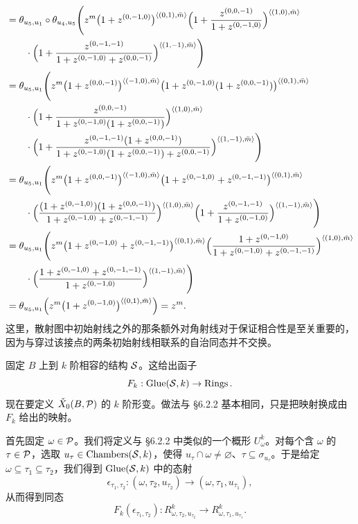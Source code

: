 \begin{example}
\[
  \begin{aligned}
  &=\theta_{u_5,u_1}\circ\theta_{u_4,u_5}
  \Biggl(z^m\bigl(1+z^{(0,-1,0)}\bigr)^{\langle(0,1),\bar m\rangle}
  \Bigl(1+\frac{z^{(0,0,-1)}}{1+z^{(0,-1,0)}}\Bigr)^{\langle(1,0),\bar m\rangle}\\
  &\qquad\cdot\Bigl(1+\frac{z^{(0,-1,-1)}}{1+z^{(0,-1,0)}+z^{(0,0,-1)}}\Bigr)^{\langle(1,-1),\bar m\rangle}\Biggr)\\
  &=\theta_{u_5,u_1}
  \Biggl(z^m\bigl(1+z^{(0,0,-1)}\bigr)^{\langle(-1,0),\bar m\rangle}
  \bigl(1+z^{(0,-1,0)}(1+z^{(0,0,-1)})\bigr)^{\langle(0,1),\bar m\rangle}\\
  &\qquad\cdot\Bigl(1+\frac{z^{(0,0,-1)}}{1+z^{(0,-1,0)}(1+z^{(0,0,-1)})}\Bigr)^{\langle(1,0),\bar m\rangle}\\
  &\qquad\cdot\Bigl(1+\frac{z^{(0,-1,-1)}(1+z^{(0,0,-1)})}
  {1+z^{(0,-1,0)}(1+z^{(0,0,-1)})+z^{(0,0,-1)}}\Bigr)^{\langle(1,-1),\bar m\rangle}\Biggr)\\
  &=\theta_{u_5,u_1}
  \Biggl(z^m\bigl(1+z^{(0,0,-1)}\bigr)^{\langle(-1,0),\bar m\rangle}
  \bigl(1+z^{(0,-1,0)}+z^{(0,-1,-1)}\bigr)^{\langle(0,1),\bar m\rangle}\\
  &\qquad\cdot\Bigl(\frac{(1+z^{(0,-1,0)})(1+z^{(0,0,-1)})}
  {1+z^{(0,-1,0)}+z^{(0,-1,-1)}}\Bigr)^{\langle(1,0),\bar m\rangle}
  \Bigl(1+\frac{z^{(0,-1,-1)}}{1+z^{(0,-1,0)}}\Bigr)^{\langle(1,-1),\bar m\rangle}\Biggr)\\
  &=\theta_{u_5,u_1}
  \Biggl(z^m\bigl(1+z^{(0,-1,0)}+z^{(0,-1,-1)}\bigr)^{\langle(0,1),\bar m\rangle}
  \Bigl(\frac{1+z^{(0,-1,0)}}{1+z^{(0,-1,0)}+z^{(0,-1,-1)}}\Bigr)^{\langle(1,0),\bar m\rangle}\\
  &\qquad\cdot\Bigl(\frac{1+z^{(0,-1,0)}+z^{(0,-1,-1)}}{1+z^{(0,-1,0)}}\Bigr)^{\langle(1,-1),\bar m\rangle}\Biggr)\\
  &=\theta_{u_5,u_1}\Bigl(z^m\bigl(1+z^{(0,-1,0)}\bigr)^{\langle(0,1),\bar m\rangle}\Bigr)
  =z^m.
  \end{aligned}
\]
这里，散射图中初始射线之外的那条额外对角射线对于保证相合性是至关重要的，因为与穿过该接点的两条初始射线相联系的自治同态并不交换。
\end{example}

固定 $B$ 上到 $k$ 阶相容的结构 $\mathcal{S}$。这给出函子
\[
  F_k:\operatorname{Glue}(\mathcal{S},k)\to\operatorname{Rings}.
\]
现在要定义 $\check X_0(B,\mathcal{P})$ 的 $k$ 阶形变。做法与 §6.2.2 基本相同，只是把映射换成由 $F_k$ 给出的映射。

首先固定 $\omega\in\mathcal{P}$。我们将定义与 §6.2.2 中类似的一个概形 $U^k_\omega$。对每个含 $\omega$ 的 $\tau\in\mathcal{P}$，选取 $u_\tau\in\operatorname{Chambers}(\mathcal{S},k)$，使得 $u_\tau\cap\omega\ne\varnothing$、$\tau\subseteq\sigma_{u_\tau}$。于是给定 $\omega\subseteq\tau_1\subseteq\tau_2$，我们得到 $\operatorname{Glue}(\mathcal{S},k)$ 中的态射
\[
  \epsilon_{\tau_1,\tau_2}:(\omega,\tau_2,u_{\tau_2})\to(\omega,\tau_1,u_{\tau_1}),
\]
从而得到同态
\[
  F_k(\epsilon_{\tau_1,\tau_2}):R^k_{\omega,\tau_2,u_{\tau_2}}\to R^k_{\omega,\tau_1,u_{\tau_1}}.
\]

